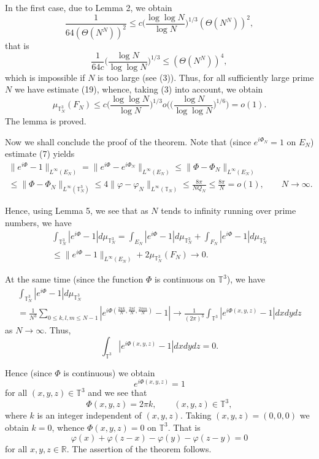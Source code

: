 \documentclass[12pt]{article}
\begin{document}
   In the first case, due to Lemma 2, we obtain
$$
\frac{1}{64(\Theta(N^N))^2}\leq
c\bigg(\frac{\log\log N}{\log N}\bigg)^{1/3}(\Theta(N^N))^2,
$$
that is
$$
\frac{1}{64c}\bigg(\frac{\log N}{\log \log N}\bigg)^{1/3}
\leq (\Theta(N^N))^4,
$$
which is impossible if $N$ is too large (see (3)). Thus, for all
sufficiently large prime $N$ we have estimate (19), whence, taking
(3) into account, we obtain
$$
\mu_{\mathbb T_N^3}(F_N)\leq c\bigg(\frac{\log\log N}{\log N}\bigg)^{1/3}
o\bigg(\bigg(\frac{\log N}{\log\log N}\bigg)^{1/6}\bigg)=o(1).
$$
The lemma is proved.

\quad

  Now we shall conclude the proof of the theorem. Note that
(since $e^{i\Phi_N}=1$ on $E_N$) estimate (7) yields
\begin{multline*}
\|e^{i\Phi}-1\|_{L^\infty(E_N)}=
\|e^{i\Phi}-e^{i\Phi_N}\|_{L^\infty(E_N)} \leq
\|\Phi-\Phi_N\|_{L^\infty(E_N)} \\ \leq
\|\Phi-\Phi_N\|_{L^\infty(\mathbb T_N^3)}\leq
 4 \|\varphi-\varphi_N\|_{L^\infty(\mathbb T_N)}
\leq\frac{8\pi}{NQ_N}\leq\frac{8\pi}{N}=o(1), \qquad
N\rightarrow\infty.
\end{multline*}

  Hence, using Lemma 5, we see that as $N$
tends to infinity running over prime numbers, we have
\begin{multline*}
\int_{\mathbb T_N^3} |e^{i\Phi}-1| d\mu_{\mathbb T_N^3}=
\int_{E_N} |e^{i\Phi}-1| d\mu_{\mathbb T_N^3}+ \int_{F_N}
|e^{i\Phi}-1| d\mu_{\mathbb T_N^3}\\ \leq
 \|e^{i\Phi}-1\|_{L^\infty(E_N)}+ 2\mu_{\mathbb
T_N^3} (F_N) \rightarrow 0.
\end{multline*}

  At the same time (since the function $\Phi$ is continuous
on $\mathbb T^3$), we have
\begin{multline*}
\int_{\mathbb T_N^3} |e^{i\Phi}-1| d\mu_{\mathbb T_N^3} \\ =
\frac{1}{N^3}\sum_{0\leq k, l, m\leq N-1} |e^{i\Phi(\frac{2\pi
k}{N}, \frac{2\pi l}{N}, \frac{2\pi m}{N})}-1|\rightarrow
\frac{1}{(2\pi)^3}\int_{\mathbb T^3}|e^{i\Phi(x, y, z)}-1| dxdydz
\end{multline*}
as $N\rightarrow\infty$.
  Thus,
$$
\int_{\mathbb T^3}|e^{i\Phi(x, y, z)}-1| dxdydz=0.
$$

  Hence (since $\Phi$ is continuous) we obtain
$$
e^{i\Phi(x, y, z)}=1
$$
for all $(x, y, z)\in\mathbb T^3$ and we see that
$$
\Phi(x, y, z)=2\pi k, \qquad (x, y, z) \in \mathbb T^3,
$$
where $k$ is an integer independent of $(x, y, z)$. Taking $(x, y,
z)=(0, 0, 0)$ we obtain $k=0$, whence $\Phi(x, y, z)=0$ on
$\mathbb T^3$. That is
$$
\varphi(x)+\varphi(z-x)-\varphi(y)-\varphi(z-y)=0
$$
for all $x, y, z \in \mathbb R$. The assertion of the theorem
follows.
\end{document}
